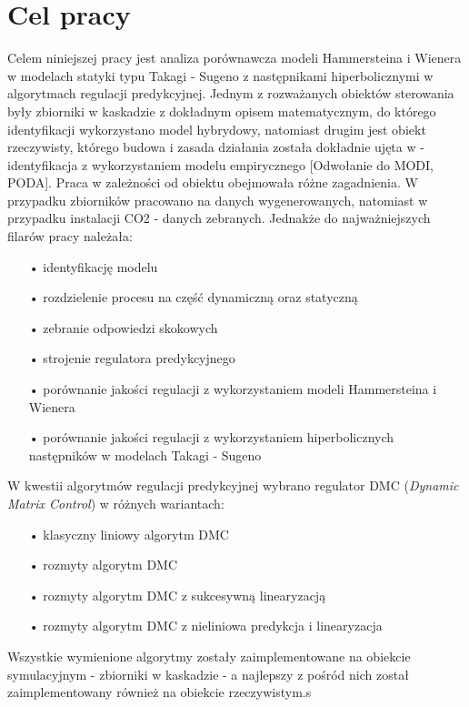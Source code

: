 \chapter{Cel pracy}
Celem niniejszej pracy jest analiza porównawcza modeli Hammersteina i Wienera w modelach statyki typu Takagi - Sugeno z następnikami hiperbolicznymi w algorytmach regulacji predykcyjnej. Jednym z rozważanych obiektów sterowania były zbiorniki w kaskadzie z dokładnym opisem matematycznym, do którego identyfikacji wykorzystano model hybrydowy, natomiast drugim jest obiekt rzeczywisty, którego budowa i zasada działania została dokładnie ujęta w \cite{20} - identyfikacja z wykorzystaniem modelu empirycznego [Odwołanie do MODI, PODA]. Praca w zależności od obiektu obejmowała różne zagadnienia. W przypadku zbiorników pracowano na danych wygenerowanych, natomiast w przypadku instalacji CO2 - danych zebranych. Jednakże do najważniejszych filarów pracy należała:
\begin{itemize}
\item[•] identyfikację modelu
\item[•] rozdzielenie procesu na część dynamiczną oraz statyczną
\item[•] zebranie odpowiedzi skokowych
\item[•] strojenie regulatora predykcyjnego
\item[•] porównanie jakości regulacji z wykorzystaniem modeli Hammersteina i Wienera
\item[•] porównanie jakości regulacji z wykorzystaniem hiperbolicznych następników w modelach Takagi - Sugeno
\end{itemize}

W kwestii algorytmów regulacji predykcyjnej wybrano regulator DMC (\textit{Dynamic Matrix Control}) w różnych wariantach:
\begin{itemize}
\item[•] klasyczny liniowy algorytm DMC
\item[•] rozmyty algorytm DMC
\item[•] rozmyty algorytm DMC z sukcesywną linearyzacją 
\item[•] rozmyty algorytm DMC z nieliniowa predykcja i linearyzacja
\end{itemize}

Wszystkie wymienione algorytmy zostały zaimplementowane na obiekcie symulacyjnym - zbiorniki w kaskadzie - a najlepszy z pośród nich został zaimplementowany również na obiekcie rzeczywistym.s